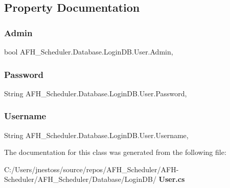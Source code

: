 \subsection{Property Documentation}
\mbox{\label{class_a_f_h___scheduler_1_1_database_1_1_login_d_b_1_1_user_ab22cb29d577634758bfbc7d2b1495960}} 
\subsubsection{Admin}
{\footnotesize\ttfamily bool A\+F\+H\+\_\+\+Scheduler.\+Database.\+Login\+D\+B.\+User.\+Admin\hspace{0.3cm}{\ttfamily [get]}, {\ttfamily [set]}}

\mbox{\label{class_a_f_h___scheduler_1_1_database_1_1_login_d_b_1_1_user_a45e02fcf5d2d94cc9800a46cb5ba93c4}} 
\subsubsection{Password}
{\footnotesize\ttfamily String A\+F\+H\+\_\+\+Scheduler.\+Database.\+Login\+D\+B.\+User.\+Password\hspace{0.3cm}{\ttfamily [get]}, {\ttfamily [set]}}

\mbox{\label{class_a_f_h___scheduler_1_1_database_1_1_login_d_b_1_1_user_aec93249270483bd7f8b6391dc9da06f2}} 
\subsubsection{Username}
{\footnotesize\ttfamily String A\+F\+H\+\_\+\+Scheduler.\+Database.\+Login\+D\+B.\+User.\+Username\hspace{0.3cm}{\ttfamily [get]}, {\ttfamily [set]}}



The documentation for this class was generated from the following file\+:\begin{DoxyCompactItemize}
\item 
C\+:/\+Users/jnestoss/source/repos/\+A\+F\+H\+\_\+\+Scheduler/\+A\+F\+H-\/\+Scheduler/\+A\+F\+H\+\_\+\+Scheduler/\+Database/\+Login\+D\+B/\textbf{ User.\+cs}\end{DoxyCompactItemize}
